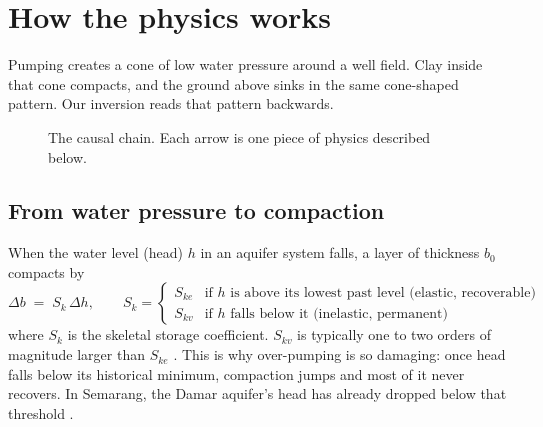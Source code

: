 \section{How the physics works}\label{sec:physics}

\begin{inshort}
Pumping creates a cone of low water pressure around a well field. Clay inside that cone compacts, and
the ground above sinks in the same cone-shaped pattern. Our inversion reads that pattern backwards.
\end{inshort}

\begin{figure}[H]
\centering
{}
\caption{The causal chain. Each arrow is one piece of physics described below.}
\end{figure}

\subsection{From water pressure to compaction}

When the water level (head) $h$ in an aquifer system falls, a layer of thickness $b_0$ compacts by
\begin{equation}
\Delta b \;=\; S_k\,\Delta h, \qquad
S_k = \begin{cases} S_{ke} & \text{if } h \text{ is above its lowest past level (elastic, recoverable)}\\
                    S_{kv} & \text{if } h \text{ falls below it (inelastic, permanent)} \end{cases}
\label{eq:compaction}
\end{equation}
where $S_k$ is the skeletal storage coefficient. $S_{kv}$ is typically one to two orders of magnitude
larger than $S_{ke}$ \cite{galloway2011}. This is why over-pumping is so damaging: once head falls
below its historical minimum, compaction jumps and most of it never recovers. In Semarang, the Damar
aquifer's head has already dropped below that threshold \cite{lo2022}.

